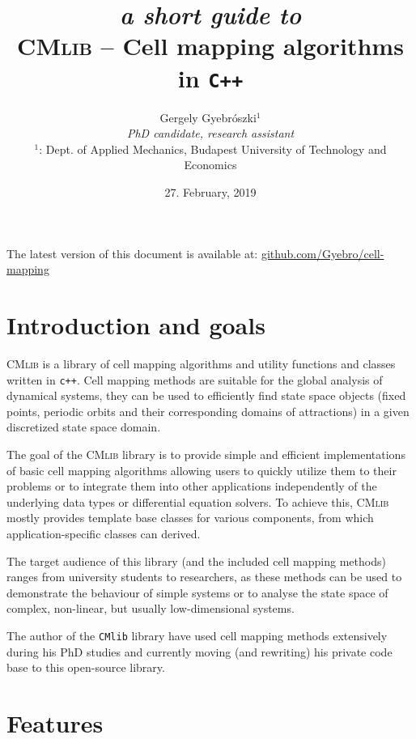 \documentclass[11pt]{article}
\title{{\small \emph{a short guide to}\\}
\textsc{CMlib} -- Cell mapping algorithms in \texttt{C++}}
\author{Gergely Gyebrószki$^1$ \\
\emph{PhD candidate, research assistant} \\
$^1$: Dept. of Applied Mechanics, Budapest University of Technology and Economics
}
\date{27. February, 2019}
\begin{document}
\maketitle

{\small The latest version of this document is available at: \href{https://github.com/Gyebro/cell-mapping/blob/master/docs/tex/cell-mapping-cpp.pdf}{github.com/Gyebro/cell-mapping}}
	
\section{Introduction and goals}

\textsc{CMlib} is a library of cell mapping algorithms and utility functions and classes written in \texttt{c++}. 
Cell mapping methods are suitable for the global analysis of dynamical systems, they can be used to efficiently find state space objects (fixed points, periodic orbits and their corresponding domains of attractions) in a given discretized state space domain. 

The goal of the \textsc{CMlib} library is to provide simple and efficient implementations of basic cell mapping algorithms allowing users to quickly utilize them to their problems or to integrate them into other applications independently of the underlying data types or differential equation solvers. To achieve this, \textsc{CMlib} mostly provides template base classes for various components, from which application-specific classes can derived.

The target audience of this library (and the included cell mapping  methods) ranges from university students to researchers, as these methods can be used to demonstrate the behaviour of simple systems or to analyse the state space of complex, non-linear, but usually low-dimensional systems. 

The author of the \texttt{CMlib} library have used cell mapping methods extensively during his PhD studies and currently moving (and rewriting) his private code base to this open-source library.

\section{Features}
\end{document}
